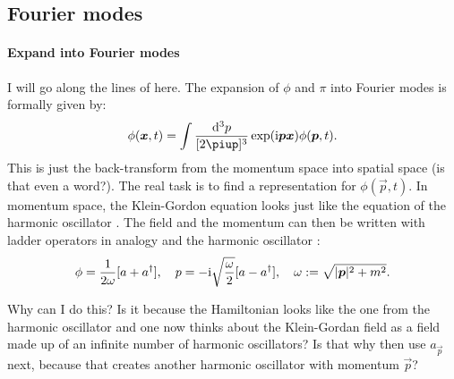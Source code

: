 \documentclass[11pt, english, fleqn, DIV=15, headinclude, BCOR=1cm]{scrartcl}
\begin{document}
\subsection{Fourier modes}

\paragraph{Expand into Fourier modes}

I will go along the lines of \textcite[§\,2.3]{Peskin/QFT/1995} here. The
expansion of $\phi$ and $\pi$ into Fourier modes is formally given by:
\begin{equation}
    \phi(\vec x, t) = \int \frac{\dif^3p}{[2\piup]^3} \exp(\iup \vec p \vec x)
    \phi(\vec p, t).
\end{equation}
This is just the back-transform from the momentum space into spatial space (is
that even a word?). The real task is to find a representation for $\phi(\vec p,
t)$. In momentum space, the Klein-Gordon equation looks just like the equation
of the harmonic oscillator \parencite[(2.21)]{Peskin/QFT/1995}. The field and
the momentum can then be written with ladder operators in analogy and the
harmonic oscillator
\parencite[(2.23)]{Peskin/QFT/1995}:
\begin{equation}
    \phi = \frac{1}{2 \omega} [a + a^\dagger]
    ,\quad
    p = - \mathrm i \sqrt{\frac{\omega}{2}} [a - a^\dagger]
    ,\quad
    \omega := \sqrt{|\boldsymbol{p}|^2 + m^2}.
\end{equation}

\begin{question}
    Why can I do this? Is it because the Hamiltonian looks like the one from
    the harmonic oscillator and one now thinks about the Klein-Gordan field as
    a field made up of an infinite number of harmonic oscillators? Is that why
    \textcite[(2.25)]{Peskin/QFT/1995} then use $a_{\vec p}$ next, because that
    creates another harmonic oscillator with momentum $\vec p$?
\end{question}
\end{document}
